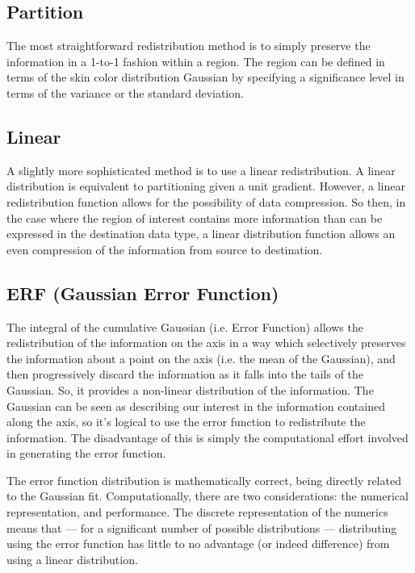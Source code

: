 \subsection{Partition}\label{sec:Partition}

The most straightforward redistribution method is to simply preserve the information in a 1-to-1 fashion within a region. The region can be defined in terms of the skin color distribution Gaussian by specifying a significance level in terms of the variance or the standard deviation.

\subsection{Linear}\label{sec:Linear}

A slightly more sophisticated method is to use a linear redistribution. A linear distribution is equivalent to partitioning given a unit gradient. However, a linear redistribution function allows for the possibility of data compression. So then, in the case where the region of interest contains more information than can be expressed in the destination data type, a linear distribution function allows an even compression of the information from source to destination. ~\cite{Lee2002}

\subsection{ERF (Gaussian Error Function)}\label{sec:ERF}

The integral of the cumulative Gaussian (i.e. Error Function) allows the redistribution of the information on the axis in a way which selectively preserves the information about a point on the axis (i.e. the mean of the Gaussian), and then progressively discard the information as it falls into the tails of the Gaussian. So, it provides a non-linear distribution of the information. The Gaussian can be seen as describing our interest in the information contained along the axis, so it's logical to use the error function to redistribute the information. The disadvantage of this is simply the computational effort involved in generating the error function.

The error function distribution is mathematically correct, being directly related to the Gaussian fit. Computationally, there are two considerations: the numerical representation, and performance. The discrete representation of the numerics means that --- for a significant number of possible distributions --- distributing using the error function has little to no advantage (or indeed difference) from using a linear distribution.

